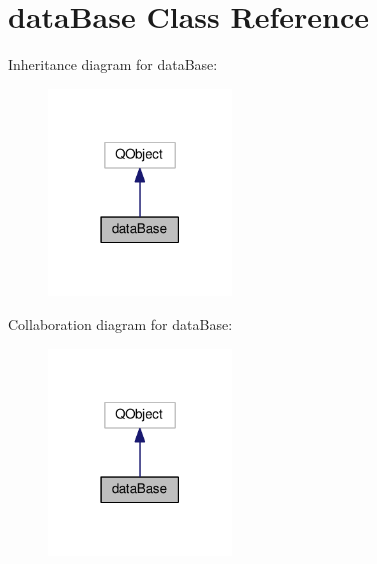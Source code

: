 \hypertarget{classdataBase}{}\section{data\+Base Class Reference}
\label{classdataBase}


Inheritance diagram for data\+Base\+:\nopagebreak
\begin{figure}[H]
\begin{center}
\leavevmode
\includegraphics[width=138pt]{classdataBase__inherit__graph}
\end{center}
\end{figure}


Collaboration diagram for data\+Base\+:\nopagebreak
\begin{figure}[H]
\begin{center}
\leavevmode
\includegraphics[width=138pt]{classdataBase__coll__graph}
\end{center}
\end{figure}
